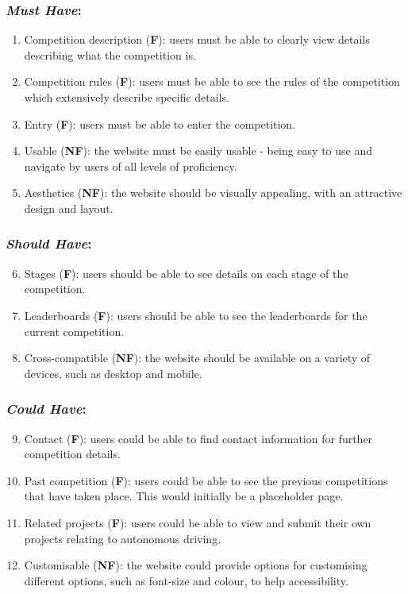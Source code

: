 \documentclass{l4proj}
\begin{document}
\subsubsection{\textit{Must Have}:}
\begin{enumerate}[label=A.\arabic*]
    \item Competition description (\textbf{F}): users must be able to clearly view details describing what the competition is. \label{req:comp-description}
    \item Competition rules (\textbf{F}): users must be able to see the rules of the competition which extensively describe specific details. \label{req:comp-rules}
    \item Entry (\textbf{F}): users must be able to enter the competition. \label{req:comp-entry}
    \item Usable (\textbf{NF}): the website must be easily usable - being easy to use and navigate by users of all levels of proficiency.
    \item Aesthetics (\textbf{NF}): the website should be visually appealing, with an attractive design and layout.
\end{enumerate}

\subsubsection{\textit{Should Have}:}
\begin{enumerate}[label=A.\arabic*]
\setcounter{enumi}{5}
    \item Stages (\textbf{F}): users should be able to see details on each stage of the competition. \label{req:comp-stages}
    \item Leaderboards (\textbf{F}): users should be able to see the leaderboards for the current competition. \label{req:comp-leaderboards}
    \item Cross-compatible (\textbf{NF}): the website should be available on a variety of devices, such as desktop and mobile.
\end{enumerate}

\subsubsection{\textit{Could Have}:}
\begin{enumerate}[label=A.\arabic*]
\setcounter{enumi}{8}
    \item Contact (\textbf{F}): users could be able to find contact information for further competition details. \label{req:comp-contact}
    \item Past competition (\textbf{F}): users could be able to see the previous competitions that have taken place. This would initially be a placeholder page. \label{req:comp-past-comps}
    \item Related projects (\textbf{F}): users could be able to view and submit their own projects relating to autonomous driving.
    \item Customisable (\textbf{NF}): the website could provide options for customising different options, such as font-size and colour, to help accessibility.
\end{enumerate}
\end{document}
